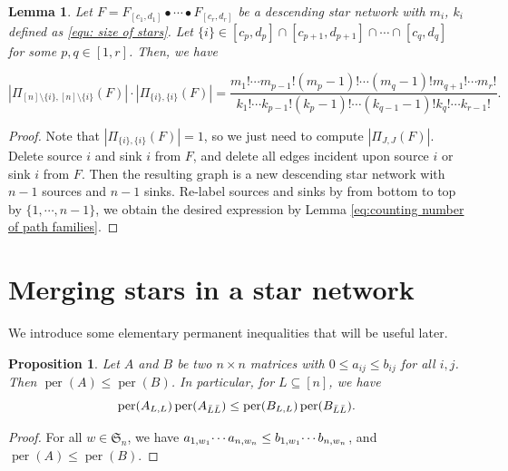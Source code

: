 \documentclass[12pt]{amsart}
\newtheorem{prop}[thm]{Proposition}
\newtheorem{lem}[thm]{Lemma}
\theoremstyle{definition}
\numberwithin{equation}{section}
\newcommand{\sn}{\mathfrak{S}_n}
\newcommand{\ntnsp}{\negthinspace}
\DeclareMathOperator{\perm}{per}
\newcommand{\permmon}[2]{#1_{1,#2_1} \ntnsp\cdots #1_{n,#2_n}}
\begin{document}
\begin{lem}\label{lem: minusxi}
    Let $F=F_{[c_1,d_1]} \bullet \cdots \bullet F_{[c_r,d_r]}$ be a descending star network with $m_i$, $k_i$ defined as \eqref{equ: size of stars}. Let $\{i\} \in [c_p,d_p] \cap [c_{p+1},d_{p+1}] \cap \cdots \cap [c_q,d_q]$ for some $p ,q \in [1,r]$. Then, we have

\begin{equation*}
    |\Pi_{[n]\setminus\{i\},[n]\setminus\{i\}}(F)| \cdot |\Pi_{\{i\}, \{i\}}(F)| = \frac{m_1! \cdots m_{p-1}! (m_{p} -1)! \cdots (m_q -1)! m_{q+1}! \cdots m_r!}{k_1! \cdots k_{p-1}! (k_p -1)! \cdots (k_{q-1} -1)! k_q! \cdots k_{r-1}!}.
\end{equation*}

\end{lem}
\begin{proof}
    Note that $|\Pi_{\{i\}, \{i\}}(F)| =1$, so we just need to compute $|\Pi_{J,J}(F)|$. Delete source $i$ and sink $i$ from $F$, and delete all edges incident upon source $i$ or sink $i$ from $F$. Then the resulting graph is a new descending star network with $n-1$ sources and $n-1$ sinks. Re-label sources and sinks by from bottom to top by $\{1,\cdots, n-1\}$, we obtain the desired expression by Lemma \ref{eq:counting number of path families}.
\end{proof}

\section{Merging stars in a star network}\label{s:merge}

We introduce some elementary permanent inequalities that will be useful later.

\begin{prop}\label{prop: obvious perm inequality}
    Let $A$ and $B$ be two $n\times n$ matrices with $0\leq a_{ij} \leq b_{ij}$ for all $i,j$.
    Then $\perm(A) \leq \perm(B)$. In particular, for $L\subseteq [n]$, we have \begin{equation}\perm(A_{L,L})\perm(A_{\Bar{L}\Bar{L}}) \leq \perm(B_{L,L})\perm(B_{\Bar{L}\Bar{L}}).\end{equation}
\end{prop}

\begin{proof}
   For all %
   $w \in \sn$,
   we have
   $\permmon aw \leq \permmon bw$, and
   $\perm(A) \leq \perm(B)$.
\end{proof}
\end{document}
